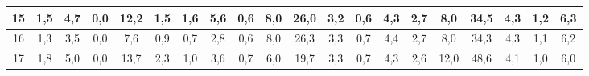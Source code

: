 \begin{sidewaystable}[]
\begin{tabular}{|c|c|c|c|c|c|c|c|c|c|c|c|c|c|c|c|c|c|c|c|}
    15 & 1,5                                             & 4,7                                             & 0,0                                             & 12,2                                             & 1,5                                              & 1,6                                              & 5,6                                              & 0,6                                              & 8,0                                              & 26,0                                             & 3,2                                              & 0,6                                              & 4,3                                              & 2,7                                              & 8,0                                              & 34,5                                             & 4,3                                              & 1,2                                              & 6,3                                              \\ \hline
    16 & 1,3                                             & 3,5                                             & 0,0                                             & 7,6                                              & 0,9                                              & 0,7                                              & 2,8                                              & 0,6                                              & 8,0                                              & 26,3                                             & 3,3                                              & 0,7                                              & 4,4                                              & 2,7                                              & 8,0                                              & 34,3                                             & 4,3                                              & 1,1                                              & 6,2                                              \\ \hline
    17 & 1,8                                             & 5,0                                             & 0,0                                             & 13,7                                             & 2,3                                              & 1,0                                              & 3,6                                              & 0,7                                              & 6,0                                              & 19,7                                             & 3,3                                              & 0,7                                              & 4,3                                              & 2,6                                              & 12,0                                             & 48,6                                             & 4,1                                              & 1,0                                              & 6,0                                              \\ \hline

\end{tabular}
\end{sidewaystable}
